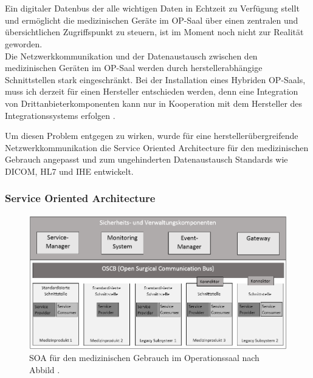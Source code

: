 \chapter{}
\label{sec:overview}

Ein digitaler Datenbus der alle wichtigen Daten in Echtzeit zu Verfügung stellt und ermöglicht die medizinischen Geräte im OP-Saal über einen zentralen und übersichtlichen Zugriffspunkt zu steuern, ist im Moment noch nicht zur Realität geworden.\\
Die Netzwerkkommunikation und der Datenaustausch zwischen den medizinischen Geräten im OP-Saal werden durch herstellerabhängige Schnittstellen stark eingeschränkt. Bei der Installation eines Hybriden OP-Saals, muss ich derzeit für einen Hersteller entschieden werden, denn \glqq eine Integration von Drittanbieterkomponenten kann nur in Kooperation mit dem Hersteller des Integrationssystems erfolgen\grqq{} \cite{DerDigitaleOperationssaal}.

Um diesen Problem entgegen zu wirken, wurde für eine herstellerübergreifende Netzwerkkommunikation die Service Oriented Architecture für den medizinischen Gebrauch angepasst und zum ungehinderten Datenaustausch Standards wie DICOM, HL7 und IHE entwickelt.

\subsection{Service Oriented Architecture}

\begin{figure} [H]
	\includegraphics[scale = 0.6]{Content/Pictures/soa-red.png}
	\caption{SOA für den medizinischen Gebrauch im Operationssaal nach Abbild \cite{DerDigitaleOperationssaal}.}
	\label{fig:soa}
\end{figure}


